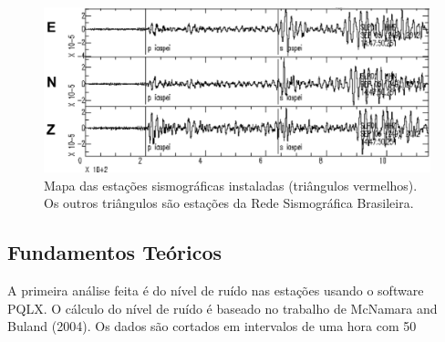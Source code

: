 \begin{figure}[!ht]
\centering
\includegraphics[scale=0.6]{sismograma.png}
\caption{Mapa das estações sismográficas instaladas (triângulos vermelhos). Os outros triângulos são estações da Rede Sismográfica Brasileira.}
\label{figura2}
\end{figure}

\subsection*{Fundamentos Teóricos}

A primeira análise feita é do nível de ruído nas estações usando o software PQLX. O cálculo do nível de ruído é baseado no trabalho de McNamara and Buland (2004). Os dados são cortados em intervalos de uma hora com 50%

